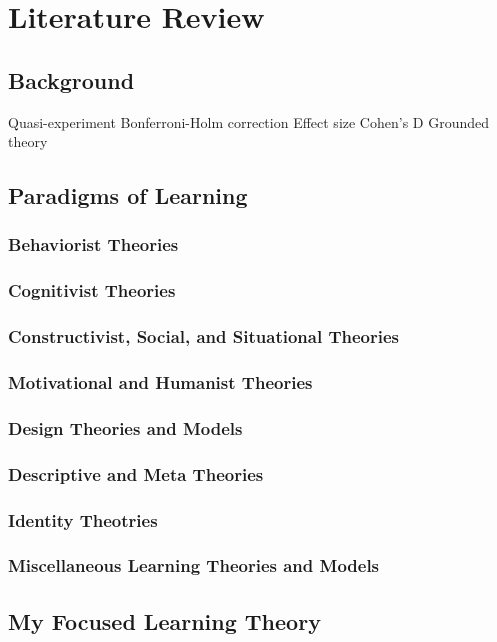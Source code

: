 \chapter[Chapter 2: Literature Review]{Literature Review}

\section{Background}

Quasi-experiment
Bonferroni-Holm correction
Effect size
Cohen’s D
Grounded theory

\section{Paradigms of Learning}

\subsection{Behaviorist Theories}
\subsection{Cognitivist Theories}
\subsection{Constructivist, Social, and Situational Theories}
\subsection{Motivational and Humanist Theories}
\subsection{Design Theories and Models}
\subsection{Descriptive and Meta Theories}
\subsection{Identity Theotries}
\subsection{Miscellaneous Learning Theories and Models}

\section{My Focused Learning Theory}


